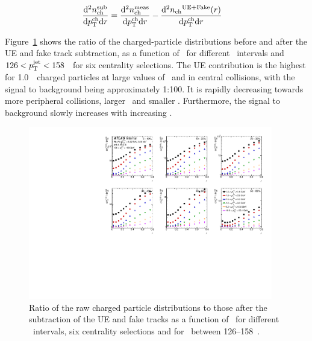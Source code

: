\begin{align}
\frac{\mathrm{d}^2 \mbox{$n_{\mathrm{ch}}^{\mathrm{sub}}$} }{ \mathrm{d} \mbox{$p_{\mathrm{T}}^{\mathrm{ch}}$} \mathrm{d} r } &=  \frac{\mathrm{d}^2 \mbox{$n_{\mathrm{ch}}^{\mathrm{meas}}$} }{ \mathrm{d} \mbox{$p_{\mathrm{T}}^{\mathrm{ch}}$} \mathrm{d} r} -  \frac{ \mathrm{d}^2 \mbox{$n_{\mathrm{ch}}$}^{\mathrm{UE+Fake}}(r)  }{ \mathrm{d} \mbox{$p_{\mathrm{T}}^{\mathrm{ch}}$} \mathrm{d} r} 
\end{align}

Figure~\ref{fig:UEsize} shows the ratio of the charged-particle distributions before and after the UE and fake track subtraction,
 as a function of \rvar\ for different \pttrk\ intervals and $126 < \mbox{$p_{\mathrm{T}}^{\mathrm{jet}}$} < 158$ \GeV\ for six centrality selections. The UE contribution is the highest for 1.0~\GeV\ charged particles at large values of \rvar\ and in central collisions, with the signal to background being approximately 1:100. It is rapidly decreasing towards more peripheral collisions, larger \pttrk\ and smaller \rvar. Furthermore, the signal to background
slowly increases with increasing \ptjet.

\begin{figure}
\centerline{
 \includegraphics[width=0.95\textwidth]{figures/performance/UE_B2S_single_0.pdf} }
\caption{ Ratio of the raw charged particle distributions to those after the subtraction of the UE and fake tracks as a function of \rvar\ for different \pttrk\ intervals, six centrality selections and for \ptjet\ between 126--158~\GeV.}
\label{fig:UEsize}
\end{figure}



